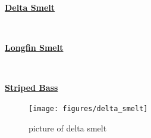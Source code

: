 \documentclass[
]{book}
\begin{document}
\begin{panel-grid}

\begin{columns-nocenter}

\begin{column800}

\textbf{\href{http://calfish.ucdavis.edu/species/?uid=47\&ds=698}{Delta Smelt}}

\end{column800}

\begin{column40}

~

\end{column40}

\begin{column800}

\textbf{\href{http://calfish.ucdavis.edu/species/?uid=87\&ds=698}{Longfin Smelt}}

\end{column800}

\begin{column40}

~

\end{column40}

\begin{column800}

\textbf{\href{http://calfish.ucdavis.edu/species/?uid=160\&ds=698}{Striped Bass}}

\end{column800}

\end{columns-nocenter}

\begin{columns-nocenter}

\begin{column800}

\begin{figure}

{\centering \texttt{[image: figures/delta\_smelt]} 

}

\caption{picture of delta smelt}\label{fig:unnamed-chunk-136}
\end{figure}

\end{column800}

\begin{column40}

~

\end{column40}


\end{columns-nocenter}
\end{panel-grid}
\end{document}

